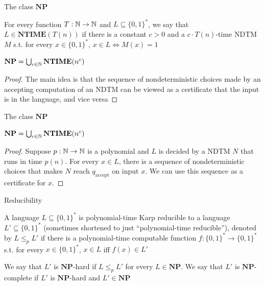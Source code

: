 \documentclass[presentation]{beamer}
\def \NTIME {\textbf{NTIME}}
\def \NP {\textbf{NP}}
\def \NP {\textbf{NP}}
\def \accept {\text{accept}}
\begin{document}
\begin{frame}[label={sec:orgfb53dfc}]{The class \texorpdfstring{\(\NP\)}{NP}}
\begin{definition}[]
For every function \(T:\mathbb{N}\to\mathbb{N}\) and \(L\subseteq\{0,1\}^*\), we say that \(L\in\NTIME(T(n))\) if there is a
constant \(c>0\) and a \(c\cdot T(n)\)-time NDTM \(M\) s.t. for
every \(x\in\{0,1\}^*\), \(x\in L\Leftrightarrow M(x)=1\)
\end{definition}

\begin{theorem}[]
\(\NP=\bigcup_{c\in\N}\NTIME(n^c)\)
\end{theorem}

\begin{proof}
The main idea is that the sequence of nondeterministic choices made by an accepting computation
of an NDTM  can be viewed as a certificate that the input is in the language, and vice versa
\end{proof}
\end{frame}
\begin{frame}[label={sec:org1b9fd93}]{The class \texorpdfstring{\(\NP\)}{NP}}
\begin{theorem}[]
\(\NP=\bigcup_{c\in\N}\NTIME(n^c)\)
\end{theorem}

\begin{proof}
Suppose \(p:\mathbb{N}\to\mathbb{N}\) is a polynomial and \(L\) is decided by a NDTM \(N\) that runs in
time \(p(n)\). For every \(x\in L\), there is a sequence of nondeterministic choices that
makes \(N\) reach \(q_{\accept}\) on input \(x\). We can use this sequence as a \alert{certificate} for \(x\).
\end{proof}
\end{frame}
\begin{frame}[label={sec:orga5eebe4}]{Reducibility}
\begin{definition}[]
A language \(L\subseteq\{0,1\}^*\) is \alert{polynomial-time Karp reducible to a
language} \(L'\subseteq\{0,1\}^*\) (sometimes shortened to just ``polynomial-time reducible''), denoted
by \(L\le_p L'\) if there is a polynomial-time
computable function \(f:\{0,1\}^*\to\{0,1\}^*\) s.t. for every \(x\in\{0,1\}^*\),
\(x\in L\) iff \(f(x)\in L'\)

We say that \(L'\) is \alert{\(\NP\)-hard} if \(L\le_pL'\) for every \(L\in\NP\). We say that \(L'\)
is \alert{\(\NP\)-complete} if \(L'\) is \(\NP\)-hard and \(L'\in\NP\)
\end{definition}
\end{frame}
\end{document}
